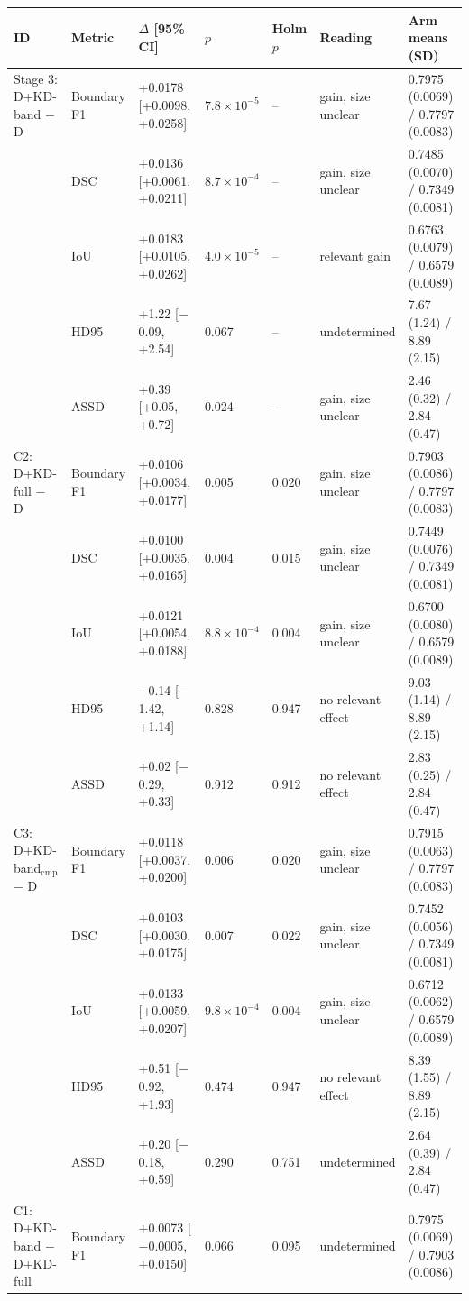 \begin{tabular}{@{}lllllll@{}}
\toprule
ID & Metric & $\Delta$ [95\% CI] & $p$ & Holm $p$ & Reading & Arm means (SD) \\
\midrule
Stage 3: D+KD-band $-$ D & Boundary F1 & +0.0178 [+0.0098, +0.0258] & $7.8\times10^{-5}$ & -- & gain, size unclear & 0.7975 (0.0069) / 0.7797 (0.0083) \\
 & DSC & +0.0136 [+0.0061, +0.0211] & $8.7\times10^{-4}$ & -- & gain, size unclear & 0.7485 (0.0070) / 0.7349 (0.0081) \\
 & IoU & +0.0183 [+0.0105, +0.0262] & $4.0\times10^{-5}$ & -- & relevant gain & 0.6763 (0.0079) / 0.6579 (0.0089) \\
 & HD95 & +1.22 [$-$0.09, +2.54] & 0.067 & -- & undetermined & 7.67 (1.24) / 8.89 (2.15) \\
 & ASSD & +0.39 [+0.05, +0.72] & 0.024 & -- & gain, size unclear & 2.46 (0.32) / 2.84 (0.47) \\
\midrule
C2: D+KD-full $-$ D & Boundary F1 & +0.0106 [+0.0034, +0.0177] & 0.005 & 0.020 & gain, size unclear & 0.7903 (0.0086) / 0.7797 (0.0083) \\
 & DSC & +0.0100 [+0.0035, +0.0165] & 0.004 & 0.015 & gain, size unclear & 0.7449 (0.0076) / 0.7349 (0.0081) \\
 & IoU & +0.0121 [+0.0054, +0.0188] & $8.8\times10^{-4}$ & 0.004 & gain, size unclear & 0.6700 (0.0080) / 0.6579 (0.0089) \\
 & HD95 & $-$0.14 [$-$1.42, +1.14] & 0.828 & 0.947 & no relevant effect & 9.03 (1.14) / 8.89 (2.15) \\
 & ASSD & +0.02 [$-$0.29, +0.33] & 0.912 & 0.912 & no relevant effect & 2.83 (0.25) / 2.84 (0.47) \\
\midrule
C3: D+KD-band$_{\mathrm{cmp}}$ $-$ D & Boundary F1 & +0.0118 [+0.0037, +0.0200] & 0.006 & 0.020 & gain, size unclear & 0.7915 (0.0063) / 0.7797 (0.0083) \\
 & DSC & +0.0103 [+0.0030, +0.0175] & 0.007 & 0.022 & gain, size unclear & 0.7452 (0.0056) / 0.7349 (0.0081) \\
 & IoU & +0.0133 [+0.0059, +0.0207] & $9.8\times10^{-4}$ & 0.004 & gain, size unclear & 0.6712 (0.0062) / 0.6579 (0.0089) \\
 & HD95 & +0.51 [$-$0.92, +1.93] & 0.474 & 0.947 & no relevant effect & 8.39 (1.55) / 8.89 (2.15) \\
 & ASSD & +0.20 [$-$0.18, +0.59] & 0.290 & 0.751 & undetermined & 2.64 (0.39) / 2.84 (0.47) \\
\midrule
C1: D+KD-band $-$ D+KD-full & Boundary F1 & +0.0073 [$-$0.0005, +0.0150] & 0.066 & 0.095 & undetermined & 0.7975 (0.0069) / 0.7903 (0.0086) \\

\end{tabular}
